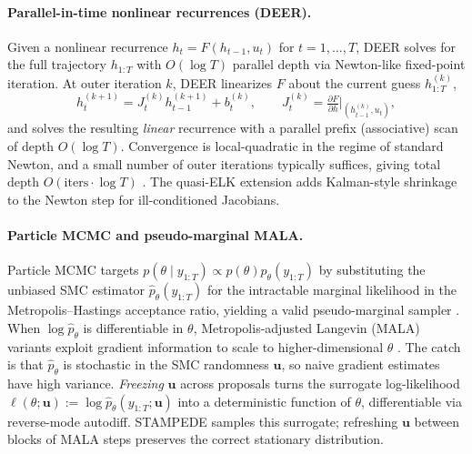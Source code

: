 \documentclass{article}
\begin{document}
\paragraph{Parallel-in-time nonlinear recurrences (DEER).} Given a nonlinear recurrence $h_t = F(h_{t-1}, u_t)$ for $t = 1, \ldots, T$, DEER \citep{lim2024parallelizing} solves for the full trajectory $h_{1:T}$ with $O(\log T)$ parallel depth via Newton-like fixed-point iteration. At outer iteration $k$, DEER linearizes $F$ about the current guess $h_{1:T}^{(k)}$,
\[
    h_t^{(k+1)} = J_t^{(k)} h_{t-1}^{(k+1)} + b_t^{(k)}, \qquad J_t^{(k)} = \tfrac{\partial F}{\partial h}\big|_{(h_{t-1}^{(k)}, u_t)},
\]
and solves the resulting \emph{linear} recurrence with a parallel prefix (associative) scan \citep{blelloch1990prefix,sarkka2021temporal} of depth $O(\log T)$. Convergence is local-quadratic in the regime of standard Newton, and a small number of outer iterations typically suffices, giving total depth $O(\text{iters} \cdot \log T)$ \citep{lim2024parallelizing,gonzalez2024towards}. The quasi-ELK extension \citep{gonzalez2024towards} adds Kalman-style shrinkage to the Newton step for ill-conditioned Jacobians.

\paragraph{Particle MCMC and pseudo-marginal MALA.} Particle MCMC \citep{andrieu2010particle} targets $p(\theta \mid y_{1:T}) \propto p(\theta) p_\theta(y_{1:T})$ by substituting the unbiased SMC estimator $\hat{p}_\theta(y_{1:T})$ for the intractable marginal likelihood in the Metropolis--Hastings acceptance ratio, yielding a valid pseudo-marginal sampler \citep{andrieu2009pseudo}. When $\log \hat{p}_\theta$ is differentiable in $\theta$, Metropolis-adjusted Langevin (MALA) variants exploit gradient information to scale to higher-dimensional $\theta$ \citep{nemeth2016particle}. The catch is that $\hat{p}_\theta$ is stochastic in the SMC randomness $\mathbf{u}$, so naive gradient estimates have high variance. \emph{Freezing} $\mathbf{u}$ across proposals \citep{deligiannidis2018correlated,finke2023conditional} turns the surrogate log-likelihood $\ell(\theta; \mathbf{u}) := \log \hat{p}_\theta(y_{1:T}; \mathbf{u})$ into a deterministic function of $\theta$, differentiable via reverse-mode autodiff. STAMPEDE samples this surrogate; refreshing $\mathbf{u}$ between blocks of MALA steps preserves the correct stationary distribution.
\end{document}
